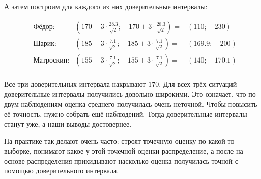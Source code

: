 \documentclass[12pt, a4paper, oneside]{article}
\begin{document}
\begin{sol}
А затем построим для каждого из них  доверительные интервалы: 

\begin{equation*} 
\begin{aligned} 
& \text{Фёдор:}  & \left( 170 -  3 \cdot \frac{28.3}{\sqrt{2}}; \quad 170 + 3 \cdot \frac{28.3}{\sqrt{2}} \right) = &  (110; \quad 230) \\
& \text{Шарик:}  &  \left( 185 -  3 \cdot \frac{7.1}{\sqrt{2}}; \quad 185 + 3 \cdot \frac{7.1}{\sqrt{2}} \right) = &  (169.9; \quad 200) \\
& \text{Матроскин:} &  \left( 155 -  3 \cdot \frac{7.1}{\sqrt{2}}; \quad 155 + 3 \cdot \frac{7.1}{\sqrt{2}} \right) = &  (140; \quad 170.1) \\
\end{aligned}
\end{equation*}

Все три доверительных интервала накрывают $170$.  Для всех трёх ситуаций доверительные интервалы получились довольно широкими. Это означает, что по двум наблюдениям оценка среднего получилась очень неточной. Чтобы повысить её точность, нужно собрать ещё наблюдений. Тогда доверительные интервалы станут уже, а наши выводы достовернее.

На практике так делают очень часто: строят точечную оценку по какой-то выборке, понимают какое у этой точечной оценки распределение, а после на основе распределения прикидывают насколько оценка получилась точной с помощью доверительного интервала.
\end{sol} 
\end{document}
